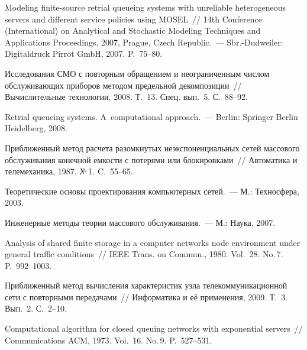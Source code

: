 \begin{multicols}{2}
{{\begin{thebibliography}{99}
Modeling finite-source retrial queueing systems with unreliable heterogeneous 
servers and different service policies using MOSEL~// 14th 
Conference (International) on Analytical and Stochastic Modeling Techniques and 
Applications Proceedings, 2007, Prague, Czech Republic.~--- Sbr.-Dudweiler: Digitaldruck 
Pirrot GmbH, 2007. P.~75--80.

Исследования СМО с повторным обращением и неограниченным числом 
обслуживающих приборов методом предельной декомпозиции~// 
Вычислительные технологии, 2008. Т.~13. Спец. вып.~5. С.~88--92.


Retrial queueing systems. A~computational approach.~--- Berlin: Springer 
Berlin Heidelberg, 2008.

Приближенный метод расчета разомк\-ну\-тых неэкспоненциальных сетей 
массового обслуживания конечной емкости с потерями или 
блокировками~// Автоматика и телемеханика, 1987. №\,1. C.~55--65.

Теоретические основы проектирования компьютерных сетей.~--- М.: 
Техносфера, 2003.

Инженерные методы теории массового обслуживания.~--- М.: Наука, 
2007.

Analysis of shared finite storage in a computer networks node environment 
under general traffic conditions~// IEEE Trans. on Commun., 1980. Vol.~28. 
No.\,7. P.~992--1003.

Приближенный метод вычисления характеристик узла 
телекоммуникационной сети с повторными передачами~// Информатика 
и её применения, 2009. Т.~3. Вып.~2. С.~2--10.

\label{end\stat}


Computational algorithm for closed queuing networks with exponential 
servers~// Communications ACM, 1973. Vol.~16. No.\,9. P.~527--531.

 \end{thebibliography}
}
}
\end{multicols}